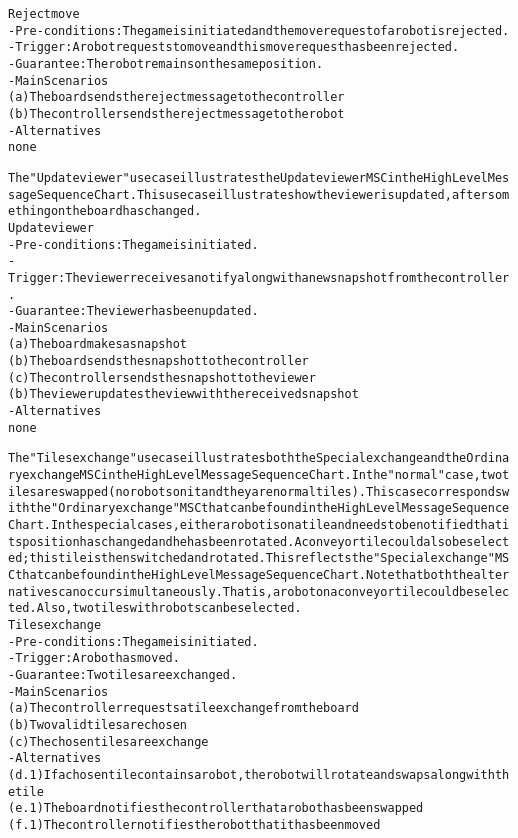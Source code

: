 \begin{alltt}
Reject move
- Pre-conditions: The game is initiated and the move request of a robot is rejected.
- Trigger: A robot requests to move and this move request has been rejected.
- Guarantee: The robot remains on the same position.
- Main Scenarios
    (a) The board sends the reject message to the controller
    (b) The controller sends the reject message to the robot
- Alternatives \\
    none

The "Update viewer" use case illustrates the Update viewer MSC in the High Level Message Sequence Chart. This use case illustrates how the viewer is updated, after something on the board has changed. \\

Update viewer
- Pre-conditions: The game is initiated.
- Trigger: The viewer receives a notify along with a new snapshot from the controller.
- Guarantee: The viewer has been updated.
- Main Scenarios
    (a) The board makes a snapshot
    (b) The board sends the snapshot to the controller
    (c) The controller sends the snapshot to the viewer
    (b) The viewer updates the view with the received snapshot
- Alternatives \\
    none

The "Tiles exchange" use case illustrates both the Special exchange and the Ordinary exchange MSC in the High Level Message Sequence Chart. In the "normal" case, two tiles are swapped (no robots on it and they are normal tiles). This case corresponds with the "Ordinary exchange" MSC that can be found in the High Level Message Sequence Chart. In the special cases, either a robot is on a tile and needs to be notified that its position has changed and he has been rotated. A conveyor tile could also be selected; this tile is then switched and rotated. This reflects the "Special exchange" MSC that can be found in the High Level Message Sequence Chart. Note that both the alternatives can occur simultaneously. That is, a robot on a conveyor tile could be selected. Also, two tiles with robots can be selected. \\

Tiles exchange
- Pre-conditions: The game is initiated.
- Trigger:  A robot has moved.
- Guarantee: Two tiles are exchanged.
- Main Scenarios
    (a) The controller requests a tile exchange from the board
    (b) Two valid tiles are chosen
    (c) The chosen tiles are exchange
- Alternatives
    (d.1) If a chosen tile contains a robot, the robot will rotate and swaps along with the tile
    (e.1) The board notifies the controller that a robot has been swapped
    (f.1) The controller notifies the robot that it has been moved \\


\end{alltt}

